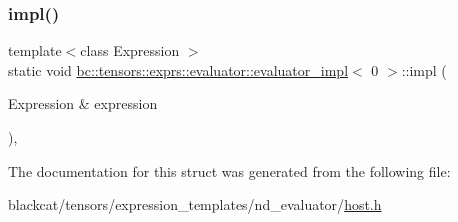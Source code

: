 \mbox{\label{structbc_1_1tensors_1_1exprs_1_1evaluator_1_1evaluator__impl_3_010_01_4_a95d9a136f6a1861e0c17170f159cffb6}} 
\subsubsection{\texorpdfstring{impl()}{impl()}}
{\footnotesize\ttfamily template$<$class Expression $>$ \\
static void \hyperlink{structbc_1_1tensors_1_1exprs_1_1evaluator_1_1evaluator__impl}{bc\+::tensors\+::exprs\+::evaluator\+::evaluator\+\_\+impl}$<$ 0 $>$\+::impl (\begin{DoxyParamCaption}\item[{Expression \&}]{expression }\end{DoxyParamCaption})\hspace{0.3cm}{\ttfamily [inline]}, {\ttfamily [static]}}



The documentation for this struct was generated from the following file\+:\begin{DoxyCompactItemize}
\item 
blackcat/tensors/expression\+\_\+templates/nd\+\_\+evaluator/\hyperlink{tensors_2expression__templates_2nd__evaluator_2host_8h}{host.\+h}\end{DoxyCompactItemize}
